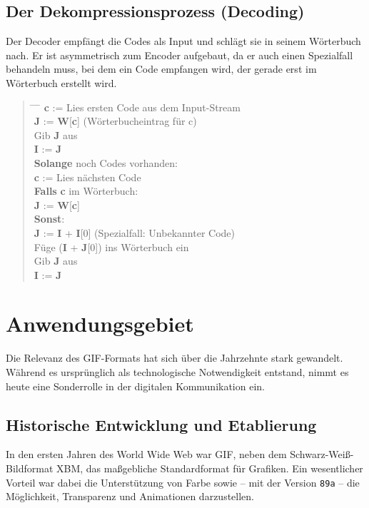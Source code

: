\documentclass[a4paper,11pt]{scrartcl}
\theoremstyle{definition} %
\begin{document}
\bigskip

\subsection{Der Dekompressionsprozess (Decoding)}
Der Decoder empfängt die Codes als Input und schlägt sie in seinem Wörterbuch nach. Er ist asymmetrisch zum Encoder aufgebaut, da er auch einen Spezialfall behandeln muss, bei dem ein Code empfangen wird, der gerade erst im Wörterbuch erstellt wird.

\begin{quote}
\begin{tabbing}
\hspace{0.5cm} \= \hspace{0.5cm} \= \hspace{0.5cm} \= \kill
\textbf{c} := Lies ersten Code aus dem Input-Stream \\
\textbf{J} := \textbf{W}[\textbf{c}] \;(Wörterbucheintrag für c) \\
Gib \textbf{J} aus \\
\textbf{I} := \textbf{J} \\
\textbf{Solange} noch Codes vorhanden: \\
\> \textbf{c} := Lies nächsten Code \\
\> \textbf{Falls} \textbf{c} im Wörterbuch: \\
\> \> \textbf{J} := \textbf{W}[\textbf{c}] \\
\> \textbf{Sonst}: \\
\> \> \textbf{J} := \textbf{I} + \textbf{I}[0] \;(Spezialfall: Unbekannter Code) \\
\> Füge (\textbf{I} + \textbf{J}[0]) ins Wörterbuch ein \\
\> Gib \textbf{J} aus \\
\> \textbf{I} := \textbf{J}
\end{tabbing}
\end{quote}

\bigskip
\section{Anwendungsgebiet}\label{kap:use}
Die Relevanz des GIF-Formats hat sich über die Jahrzehnte stark gewandelt. Während es ursprünglich als technologische Notwendigkeit entstand, nimmt es heute eine Sonderrolle in der digitalen Kommunikation ein.

\subsection{Historische Entwicklung und Etablierung}
In den ersten Jahren des World Wide Web war GIF, neben dem Schwarz-Weiß-Bildformat XBM, das maßgebliche Standardformat für Grafiken. Ein wesentlicher Vorteil war dabei die Unterstützung von Farbe sowie – mit der Version \texttt{89a} – die Möglichkeit, Transparenz und Animationen darzustellen.
\end{document}
